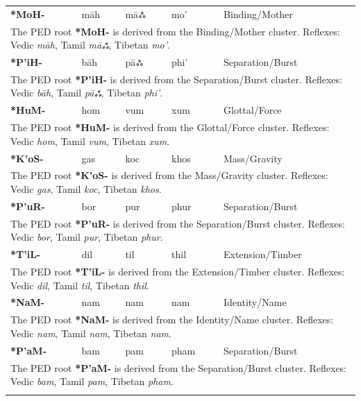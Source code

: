\begin{longtable}{p{} p{} p{} p{} p{}}
\textbf{*MoH-} & māh & māஃ & mo' & Binding/Mother \\ 
\multicolumn{5}{p{\textwidth}}{\small The PED root \textbf{*MoH-} is derived from the Binding/Mother cluster. Reflexes: Vedic \textit{māh}, Tamil \textit{māஃ}, Tibetan \textit{mo'}. } \\ \addlinespace 
\textbf{*P'iH-} & bāh & pāஃ & phi' & Separation/Burst \\ 
\multicolumn{5}{p{\textwidth}}{\small The PED root \textbf{*P'iH-} is derived from the Separation/Burst cluster. Reflexes: Vedic \textit{bāh}, Tamil \textit{pāஃ}, Tibetan \textit{phi'}. } \\ \addlinespace 
\textbf{*HuM-} & hom & vum & xum & Glottal/Force \\ 
\multicolumn{5}{p{\textwidth}}{\small The PED root \textbf{*HuM-} is derived from the Glottal/Force cluster. Reflexes: Vedic \textit{hom}, Tamil \textit{vum}, Tibetan \textit{xum}. } \\ \addlinespace 
\textbf{*K'oS-} & gas & koc & khos & Mass/Gravity \\ 
\multicolumn{5}{p{\textwidth}}{\small The PED root \textbf{*K'oS-} is derived from the Mass/Gravity cluster. Reflexes: Vedic \textit{gas}, Tamil \textit{koc}, Tibetan \textit{khos}. } \\ \addlinespace 
\textbf{*P'uR-} & bor & pur & phur & Separation/Burst \\ 
\multicolumn{5}{p{\textwidth}}{\small The PED root \textbf{*P'uR-} is derived from the Separation/Burst cluster. Reflexes: Vedic \textit{bor}, Tamil \textit{pur}, Tibetan \textit{phur}. } \\ \addlinespace 
\textbf{*T'iL-} & dil & til & thil & Extension/Timber \\ 
\multicolumn{5}{p{\textwidth}}{\small The PED root \textbf{*T'iL-} is derived from the Extension/Timber cluster. Reflexes: Vedic \textit{dil}, Tamil \textit{til}, Tibetan \textit{thil}. } \\ \addlinespace 
\textbf{*NaM-} & nam & nam & nam & Identity/Name \\ 
\multicolumn{5}{p{\textwidth}}{\small The PED root \textbf{*NaM-} is derived from the Identity/Name cluster. Reflexes: Vedic \textit{nam}, Tamil \textit{nam}, Tibetan \textit{nam}. } \\ \addlinespace 
\textbf{*P'aM-} & bam & pam & pham & Separation/Burst \\ 
\multicolumn{5}{p{\textwidth}}{\small The PED root \textbf{*P'aM-} is derived from the Separation/Burst cluster. Reflexes: Vedic \textit{bam}, Tamil \textit{pam}, Tibetan \textit{pham}. } \\ \addlinespace 

\end{longtable}
